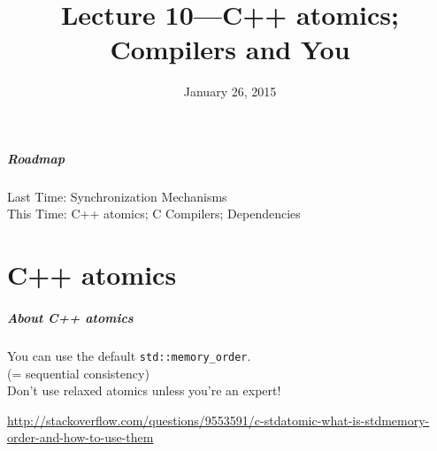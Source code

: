 \documentclass[aspectratio=43]{beamer}
\title{Lecture 10---C++ atomics; Compilers and You}
\date{January 26, 2015}
\newenvironment{changemargin}[1]{%
  \begin{list}{}{%
    \setlength{\topsep}{0pt}%
    \setlength{\leftmargin}{#1}%
    \setlength{\rightmargin}{1em}
    \setlength{\listparindent}{\parindent}%
    \setlength{\itemindent}{\parindent}%
    \setlength{\parsep}{\parskip}%
  }%
  \item[]}{\end{list}}
\begin{document}
\begin{frame}[plain]
  \titlepage
\end{frame}

\begin{frame}
  \frametitle{Roadmap}

  \Large
    \begin{changemargin}{2cm}
      Last Time: Synchronization Mechanisms\\
      This Time: C++ atomics; C Compilers; Dependencies
    \end{changemargin}
  
\end{frame}

\part{C++ atomics}
\frame{\partpage}

\begin{frame}[fragile]
  \frametitle{About C++ atomics}
  \begin{changemargin}{2cm}
    You can use the default {\tt std::memory\_order}.\\
    (= sequential consistency)\\[1em]

    \alert{Don't use relaxed atomics unless you're an expert!}\\[1em]
  \end{changemargin}
  \begin{changemargin}{1cm}
    \scriptsize     \url{http://stackoverflow.com/questions/9553591/c-stdatomic-what-is-stdmemory-order-and-how-to-use-them}
  \end{changemargin}
\end{frame}
\end{document}

